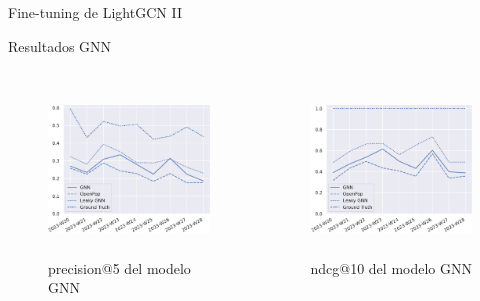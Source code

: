 \begin{frame}{Fine-tuning de LightGCN II}
\begin{figure}
    \end{figure}
\end{frame}

\begin{frame}{Resultados GNN}
\begin{columns}
\begin{figure}
    \centering
    \includegraphics[height=45mm]{./images/graphs/09_gnn_results_precision_5_leaky.pdf}
    \caption{precision@5 del modelo GNN}
\end{figure}
\begin{figure}
    \centering
    \includegraphics[height=45mm]{./images/graphs/09_gnn_results_ndcg_10_leaky.pdf}
    \caption{ndcg@10 del modelo GNN}
\end{figure}
\end{columns}
\end{frame}

